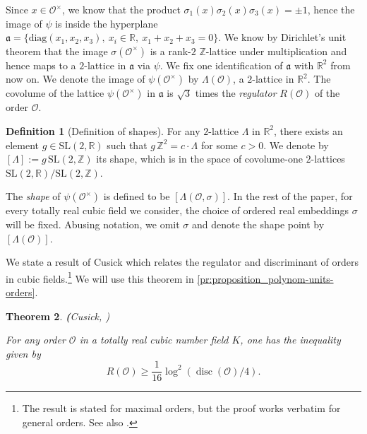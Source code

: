 \documentclass[11pt,letterpaper]{amsart}
\newtheorem{theorem}{Theorem}[section]
\theoremstyle{definition}
\newtheorem{defin}[theorem]{Definition}
\theoremstyle{remark}
\renewcommand{\rm}[1]{\mathrm{#1}}
\newcommand{\cal}[1]{\mathcal{#1}}
\newcommand{\bb}[1]{\mathbb{#1}}
\renewcommand{\frak}[1]{\mathfrak{#1}}
\newcommand{\R}{\bb R}
\newcommand{\Z}{\bb Z}
\newcommand{\calO}{\cal O}
\newcommand{\diag}{\mathrm{diag}}
\newcommand{\SL}{\rm{SL}}
\DeclareMathOperator{\disc}{disc}
\begin{document}
	Since $x\in\calO^\times$, we know that the product $\sigma_1(x)\sigma_2(x)\sigma_3(x)=\pm 1$, hence the image of $\psi$ is inside the hyperplane $\frak a=\{\diag(x_1,x_2,x_3),\ x_i\in\R,\ x_1+x_2+x_3=0 \}$. 
	We know by Dirichlet's unit theorem that the image $\sigma(\calO^\times)$ is a rank-$2$ $\mathbb{Z}$-lattice under multiplication and hence maps to a $2$-lattice in $\frak a$ via $\psi$. 
	We fix one identification of $\frak a$ with $\R^2$ from now on. We denote the image of $\psi(\calO^\times)$ by $\Lambda(\calO)$, a $2$-lattice in $\R^2$. The covolume of the lattice $\psi(\calO^\times)$ in $\frak a$ is $\sqrt{3}$ times the \emph{regulator} $R(\calO)$ of the order $\calO$. 
	
	\begin{defin}[Definition of shapes]
	\label{de:shape}
	{For any $2$-lattice $\Lambda$ in $\R^2$, there exists an element $g\in \SL(2,\R)$ such that $g\, \mathbb{Z}^{2}=  c \cdot \Lambda$ for some $c > 0$.
	We denote by $[\Lambda]:=g\, \SL(2,\mathbb{Z})$ its shape, which is in the space of covolume-one $2$-lattices $\SL(2,\R)/\SL(2,\Z)$.}

		{The \emph{shape} of $\psi(\calO^\times)$ is defined to be $[\Lambda(\calO, \sigma)]$.
		In the rest of the paper, for every totally real cubic field we consider, the choice of ordered real embeddings $\sigma$ will be fixed.
		Abusing notation, we omit $\sigma$ and denote the shape point by
		$[\Lambda(\calO)]$.} 
	\end{defin}
	
	We state a result of Cusick which relates the regulator and discriminant of orders in cubic fields.\footnote{The result is stated for maximal orders, but the proof works verbatim for general orders. See also \cite[Theorem 5.8]{conradUnit}.} We will use this theorem in \cref{pr:proposition_polynom-units-orders}.
	\begin{theorem}
		\label{th:cusick}
		{\textbf (Cusick, \cite{cusickLower1983})}
		
		For any order $\mathcal{O}$ in a totally real cubic number field $K$, one has the inequality given by 
		\begin{equation}
			R(\mathcal{O}) \geq  \frac{1}{16}  \log^2 (\disc  (\mathcal{O}) /4).
		\end{equation}
	\end{theorem}
\end{document}
